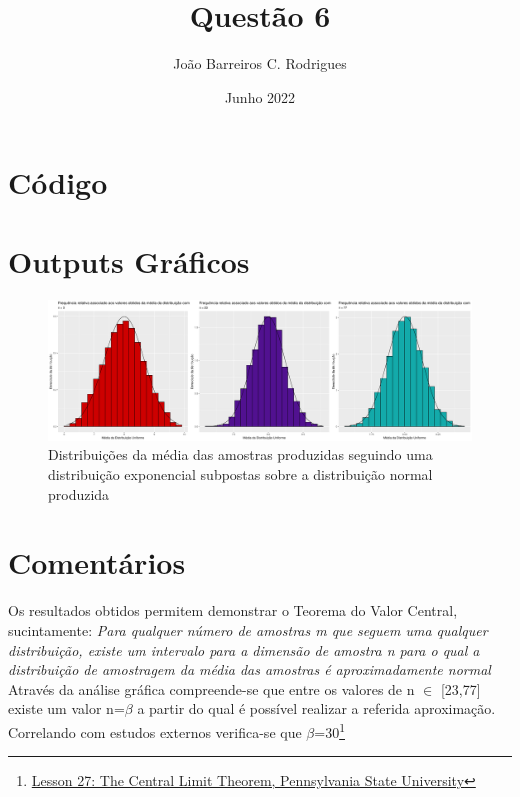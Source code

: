 \documentclass[a4paper,8pt]{extarticle}
\title{\vspace{-2.5cm} \large {\bfseries{Questão 6}}}
\author{João Barreiros C. Rodrigues}
\date{Junho 2022}
\begin{document}
	\maketitle
	\vspace{-1cm}
	\section{Código}
		
	\section{Outputs Gráficos}
		\begin{figure}[H]
                                \centering
                                \captionsetup{justification=centering}
                                \includegraphics[scale=0.20\textscale]{module6.png}
                                \caption{Distribuições da média das amostras produzidas seguindo uma distribuição exponencial subpostas sobre a distribuição normal produzida}
        	\end{figure}
	\section{Comentários}
		Os resultados obtidos permitem demonstrar o Teorema do Valor Central, sucintamente: \newline
		\textit{Para qualquer número de amostras m que seguem uma qualquer distribuição, existe um intervalo para a dimensão de amostra n para o qual a distribuição de amostragem da média das amostras é aproximadamente normal} \newline
		Através da análise gráfica compreende-se que entre os valores de n $\in$ [23,77] existe um valor n=$\beta$ a partir do qual é possível realizar a referida aproximação. Correlando com estudos externos verifica-se que $\beta$=30\footnote{\href{https://online.stat.psu.edu/stat414/book/export/html/750}{Lesson 27: The Central Limit Theorem, Pennsylvania State University}}

		
\end{document}
